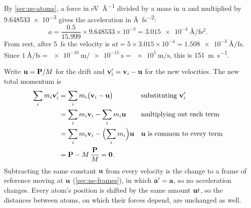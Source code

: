 By \cref{sec:ne-atoms}, a force in
\si{\electronvolt\per\angstrom} divided by a mass in \si{\amu} and
multiplied by \num{9.648533e-3} gives the acceleration in
\si{\angstrom\per\femto\second\squared}:
\begin{equation*}
   a = \frac{0.5}{15.999}\times9.648533\times10^{-3}
   = \SI{3.015e-4}{\angstrom\per\femto\second\squared} .
\end{equation*}
From rest, after \SI{5}{\femto\second} the velocity is $at = 5\times3.015
\times10^{-4} = \SI{1.508e-3}{\angstrom\per\femto\second}$. Since
$\SI{1}{\angstrom\per\femto\second} = \SI{e-10}{\metre}/\SI{e-15}{\second}
= \SI{e5}{\metre\per\second}$, this is \SI{151}{\metre\per\second}.

Write $\bm{\mathrm{u}} = \bm{\mathrm{P}}/M$ for the drift and
$\bm{\mathrm{v}}_i' = \bm{\mathrm{v}}_i - \bm{\mathrm{u}}$ for the new velocities. The new total
momentum is
\begin{align*}
   \sum_i m_i\bm{\mathrm{v}}_i'
   &= \sum_i m_i\bigl(\bm{\mathrm{v}}_i - \bm{\mathrm{u}}\bigr)
      && \text{substituting $\bm{\mathrm{v}}_i'$}\\
   &= \sum_i m_i\bm{\mathrm{v}}_i - \sum_i m_i\bm{\mathrm{u}}
      && \text{multiplying out each term}\\
   &= \sum_i m_i\bm{\mathrm{v}}_i - \Bigl(\sum_i m_i\Bigr)\bm{\mathrm{u}}
      && \text{$\bm{\mathrm{u}}$ is common to every term}\\
   &= \bm{\mathrm{P}} - M\,\frac{\bm{\mathrm{P}}}{M} = \bm{\mathrm{0}} .
\end{align*}
Subtracting the same constant $\bm{\mathrm{u}}$ from every velocity is the change
to a frame of reference moving at $\bm{\mathrm{u}}$ (\cref{sec:ne-frames}), in
which $\bm{\mathrm{a}}' = \bm{\mathrm{a}}$, so no acceleration changes. Every atom's
position is shifted by the same amount $\bm{\mathrm{u}}t$, so the distances
between atoms, on which their forces depend, are unchanged as well.
